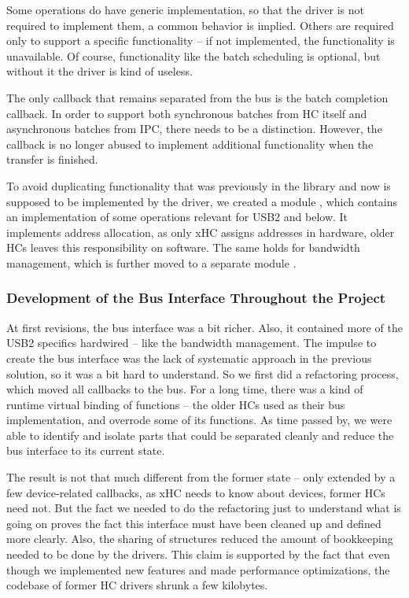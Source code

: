 Some operations do have generic implementation, so that the driver is not
required to implement them, a common behavior is implied. Others are required
only to support a specific functionality -- if not implemented, the
functionality is unavailable. Of course, functionality like the batch
scheduling is optional, but without it the driver is kind of useless.

The only callback that remains separated from the bus is the batch completion
callback. In order to support both synchronous batches from HC itself and
asynchronous batches from IPC, there needs to be a distinction. However, the
callback is no longer abused to implement additional functionality when the
transfer is finished.

To avoid duplicating functionality that was previously in the library and now is
supposed to be implemented by the driver, we created a module
,
which contains an implementation of some
operations relevant for USB2 and below. It implements address allocation, as
only xHC assigns addresses in hardware, older HCs leaves this responsibility on
software. The same holds for bandwidth management, which is further moved to
a separate module .

\subsubsection{Development of the Bus Interface Throughout the Project}

At first revisions, the bus interface was a bit richer. Also, it contained more
of the USB2 specifics hardwired -- like the bandwidth management. The impulse
to create the bus interface was the lack of systematic approach in the previous
solution, so it was a bit hard to understand. So we first did a refactoring
process, which moved all callbacks to the bus. For a long time, there was
a kind of runtime virtual binding of functions -- the older HCs used
 as their bus implementation, and overrode some of its
functions. As time passed by, we were able to identify and isolate parts that
could be separated cleanly and reduce the bus interface to its current state.

The result is not that much different from the former state -- only extended by
a few device-related callbacks, as xHC needs to know about devices, former HCs
need not. But the fact we needed to do the refactoring just to understand what
is going on proves the fact this interface must have been cleaned up and
defined more clearly. Also, the sharing of structures reduced the amount of
bookkeeping needed to be done by the drivers. This claim is supported by the
fact that even though we implemented new features and made performance
optimizations, the codebase of former HC drivers shrunk a few kilobytes.
